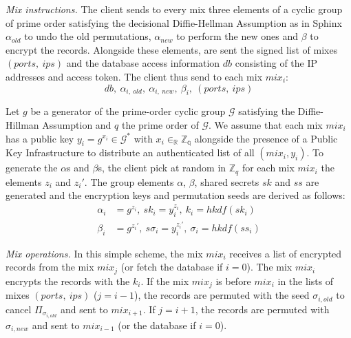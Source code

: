 \documentclass[USenglish,oneside,twocolumn]{article}
\begin{document}
\noindent\textit{Mix instructions.}
The client sends to every mix three elements of a cyclic group of prime order satisfying the decisional Diffie-Hellman Assumption as in Sphinx~\cite{danezis2009sphinx} $\alpha_{old}$ to undo the old permutations, $\alpha_{new}$ to perform the new ones and  $\beta$ to encrypt the records. Alongside these elements, are sent the signed list of mixes $(ports,\ ips)$ and the database access information $db$ consisting of the IP addresses and access token. The client thus send to each mix $mix_i$:
$$ db,\ \alpha_{i,\ old},\ \alpha_{i,\ new},\ \beta_{i},\ (ports,\ ips) $$

Let $g$ be a generator of the prime-order cyclic group $\mathcal{G}$ satisfying the Diffie-Hillman Assumption and $q$ the prime order of $\mathcal{G}$. We assume that each mix $mix_i$ has a public key $y_i=g^{x_i}\in \mathcal{G}^*$ with $x_i \in_{\mathbb{R}} \mathbb{Z_q}$ alongside the presence of a Public Key Infrastructure to distribute an authenticated list of all $(mix_i, y_i)$.
To generate the $\alpha$s and $\beta$s, the client pick at random in $\mathbb{Z}_q$ for each mix $mix_i$ the elements $z_i$ and $z_i'$. The group elements $\alpha$, $\beta$, shared secrets $sk$ and $ss$ are generated and the encryption keys and permutation seeds are derived as follows:
\begin{align*}
\alpha_i &= g^{z_i},\ sk_i = y_i^{z_i},\ k_i=hkdf(sk_i)\\
\beta_i &= g^{z_i'},\ s\sigma_i = y_i^{z_i'},\ \sigma_i=hkdf(ss_i)
\end{align*}

\noindent\textit{Mix operations.} In this simple scheme, the mix $mix_i$ receives a list of encrypted records from the mix $mix_j$ (or fetch the database if $i=0$). The mix $mix_i$ encrypts the records with the $k_i$. If the mix $mix_j$ is before $mix_i$ in the lists of mixes $(ports,\ ips)$ ($j=i-1$), the records are permuted with the seed $\sigma_{i,old}$ to cancel $\Pi_{\sigma_{i,old}}$ and sent to $mix_{i+1}$. If $j=i+1$, the records are permuted with $\sigma_{i,new}$ and sent to $mix_{i-1}$ (or the database if $i=0$).\\
\end{document}
